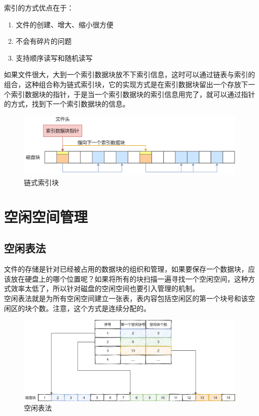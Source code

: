 索引的方式优点在于：

\begin{enumerate}
	\item 文件的创建、增大、缩小很方便
	\item 不会有碎片的问题
	\item 支持顺序读写和随机读写
\end{enumerate}

如果文件很大，大到一个索引数据块放不下索引信息，这时可以通过链表与索引的组合，这种组合称为链式索引块，它的实现方式是在索引数据块留出一个存放下一个索引数据块的指针，于是当一个索引数据块的索引信息用完了，就可以通过指针的方式，找到下一个索引数据块的信息。

\begin{figure}[H]
	\centering
	\includegraphics[scale=0.4]{img/Chapter5/5-4/2.png}
	\caption{链式索引块}
\end{figure}

\newpage

\section{空闲空间管理}

\subsection{空闲表法}

文件的存储是针对已经被占用的数据块的组织和管理，如果要保存一个数据块，应该放在硬盘上的哪个位置呢？如果将所有的块扫描一遍寻找一个空闲空间，这种方式效率太低了，所以针对磁盘的空闲空间也要引入管理的机制。\\

空闲表法就是为所有空闲空间建立一张表，表内容包括空闲区的第一个块号和该空闲区的块个数。注意，这个方式是连续分配的。

\begin{figure}[H]
	\centering
	\includegraphics[scale=0.25]{img/Chapter5/5-5/1.png}
	\caption{空闲表法}
\end{figure}


